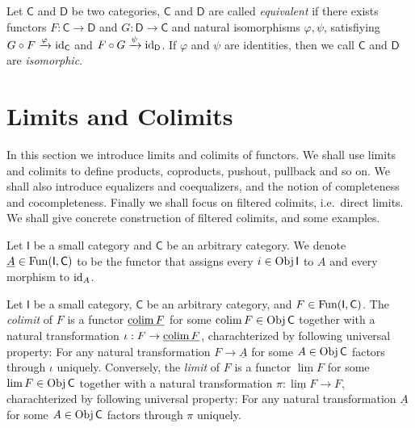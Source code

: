 \begin{defn}
    Let $\mathsf{C}$ and $\mathsf{D}$ be two categories, $\mathsf{C}$ and $\mathsf{D}$ are called \emph{equivalent} if there exists functors $F:\mathsf{C}\to\mathsf{D}$ and $G:\mathsf{D}\to\mathsf{C}$ and natural isomorphisms $\varphi,\psi$, satisfiying $G\circ F\xrightarrow{\varphi}\mathrm{id}_\mathsf{C}$ and $F\circ G\xrightarrow{\psi}\mathrm{id}_\mathsf{D}$.
    If $\varphi$ and $\psi$ are identities, then we call $\mathsf{C}$ and $\mathsf{D}$ are \emph{isomorphic}.
\end{defn}

\section{Limits and Colimits}

In this section we introduce limits and colimits of functors.
We shall use limits and colimits to define products, coproducts, pushout, pullback and so on.
We shall also introduce equalizers and coequalizers, and the notion of completeness and cocompleteness.
Finally we shall focus on filtered colimits, i.e.\ direct limits.
We shall give concrete construction of filtered colimits, and some examples.

\begin{nota}
    Let $\mathsf{I}$ be a small category and $\mathsf{C}$ be an arbitrary category.
    We denote $\underline{A}\in\operatorname{Fun}(\mathsf{I},\mathsf{C})$ to be the functor that assigns every $i\in\operatorname{Obj}\mathsf{I}$ to $A$ and every morphism to $\mathrm{id}_A$.
\end{nota}

\begin{defn}
    Let $\mathsf{I}$ be a small category, $\mathsf{C}$ be an arbitrary category, and $F\in\operatorname{Fun}(\mathsf{I},\mathsf{C})$.
    The \emph{colimit} of $F$ is a functor $\underline{\operatorname*{colim}{F}}$ for some $\operatorname*{colim}{F}\in\operatorname{Obj}\mathsf{C}$ together with a natural transformation $\iota:F\to\underline{\operatorname*{colim}{F}}$, charachterized by following universal property:
    For any natural transformation $F\to\underline{A}$ for some $A\in\operatorname{Obj}\mathsf{C}$ factors through $\iota$ uniquely.
    Conversely, the \emph{limit} of $F$ is a functor $\underline{\lim{F}}$ for some $\lim{F}\in\operatorname{Obj}\mathsf{C}$ together with a natural transformation $\pi:\underline{\lim{F}}\to F$, charachterized by following universal property:
    For any natural transformation $\underline{A}$ for some $A\in\operatorname{Obj}\mathsf{C}$ factors through $\pi$ uniquely.
\end{defn}

